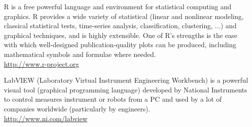 	{\Large {}}{\Large {}}{\Large {}} R is a free powerful language and environment for statistical computing and graphics. R provides a wide variety of statistical (linear and nonlinear modeling, classical statistical tests, time-series analysis, classification, clustering, ...) and graphical techniques, and is highly extensible. One of R's strengths is the ease with which well-designed publication-quality plots can be produced, including mathematical symbols and formulae where needed.\\
	\href{http://www.r-project.org}{\color{blue}http://www.r-project.org}
	
	{\Large {}}{\Large {}} LabVIEW (Laboratory Virtual Instrument Engineering Workbench) is a powerful visual tool (graphical programming language) developed by National Instruments to control measures instrument or robots from a PC and used by a lot of companies worldwide (particularly by engineers).\\
	\href{http://www.ni.com/labview}{\color{blue}http://www.ni.com/labview}